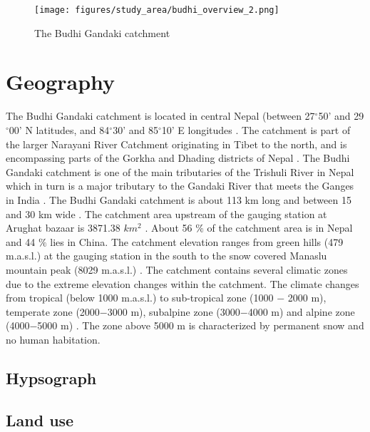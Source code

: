 
\begin{figure}[ht]
    \centering
    \texttt{[image: figures/study\_area/budhi\_overview\_2.png]}
    \caption{The Budhi Gandaki catchment}
    \label{fig:overview_budhi_gandaki}
\end{figure}


\section{Geography}


The Budhi Gandaki catchment is located in central Nepal (between 27$^{\circ}$50' and 29$^{\circ}$00' N latitudes, and 84$^{\circ}$30' and 85$^{\circ}$10' E longitudes \autocite{marahattaHydrologicalModelingBetter2021}. The catchment is part of the larger Narayani River Catchment originating in Tibet to the north, and is encompassing parts of the Gorkha and Dhading districts of Nepal \autocite{devkotaClimateChangeAdaptation2017}. The Budhi Gandaki catchment is one of the main tributaries of the Trishuli River in Nepal which in turn is a major tributary to the Gandaki River that meets the Ganges in India \autocite{khatriModellingStreamflowSnow2018}. The Budhi Gandaki catchment is about 113 km long and between 15 and 30 km wide \autocite{marahattaHydrologicalModelingBetter2021}. The catchment area upstream of the gauging station at Arughat bazaar is 3871.38 $km^{2}$ \autocite{khatriModellingStreamflowSnow2018}. About 56 $\%$ of the catchment area is in Nepal and 44 $\%$ lies in China. The catchment elevation ranges from green hills (479 m.a.s.l.) at the gauging station in the south to the snow covered Manaslu mountain peak (8029 m.a.s.l.) \autocite{khatriModellingStreamflowSnow2018}. The catchment contains several climatic zones due to the extreme elevation changes within the catchment. The climate changes from tropical (below 1000 m.a.s.l.) to sub-tropical zone (1000 $-$ 2000 m), temperate zone (2000$-$3000 m), subalpine zone (3000$-$4000 m) and alpine zone (4000$-$5000 m) \autocite{khatriModellingStreamflowSnow2018}. The zone above 5000 m is characterized by permanent snow and no human habitation.

\subsection{Hypsograph}

\subsection{Land use}

